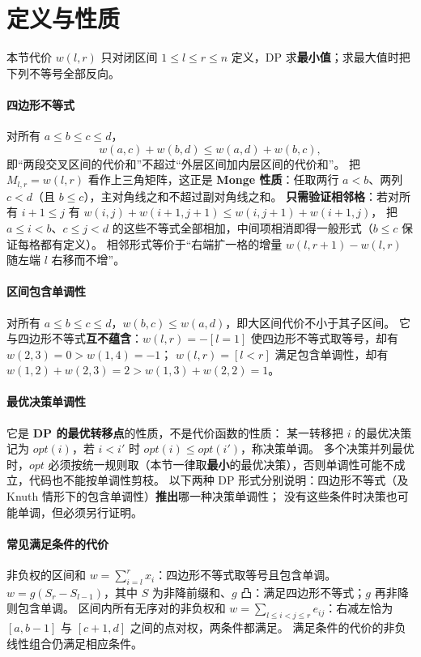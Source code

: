 \section{定义与性质}\label{knowledge-quadrangle-definitions}
本节代价 $w(l,r)$ 只对闭区间 $1\le l\le r\le n$ 定义，DP 求\textbf{最小值}；求最大值时把下列不等号全部反向。

\paragraph{四边形不等式} 对所有 $a\le b\le c\le d$，
\[
 w(a,c)+w(b,d)\le w(a,d)+w(b,c),
\]
即“两段交叉区间的代价和”不超过“外层区间加内层区间的代价和”。
把 $M_{l,r}=w(l,r)$ 看作上三角矩阵，这正是 \textbf{Monge 性质}：任取两行 $a<b$、两列 $c<d$（且 $b\le c$），主对角线之和不超过副对角线之和。
\textbf{只需验证相邻格}：若对所有 $i+1\le j$ 有 $w(i,j)+w(i+1,j+1)\le w(i,j+1)+w(i+1,j)$，
把 $a\le i<b$、$c\le j<d$ 的这些不等式全部相加，中间项相消即得一般形式（$b\le c$ 保证每格都有定义）。
相邻形式等价于“右端扩一格的增量 $w(l,r+1)-w(l,r)$ 随左端 $l$ 右移而不增”。

\paragraph{区间包含单调性} 对所有 $a\le b\le c\le d$，$w(b,c)\le w(a,d)$，即大区间代价不小于其子区间。
它与四边形不等式\textbf{互不蕴含}：$w(l,r)=-[l=1]$ 使四边形不等式取等号，却有 $w(2,3)=0>w(1,4)=-1$；
$w(l,r)=[l<r]$ 满足包含单调性，却有 $w(1,2)+w(2,3)=2>w(1,3)+w(2,2)=1$。

\paragraph{最优决策单调性} 它是 \textbf{DP 的最优转移点}的性质，不是代价函数的性质：
某一转移把 $i$ 的最优决策记为 $opt(i)$，若 $i<i'$ 时 $opt(i)\le opt(i')$，称决策单调。
多个决策并列最优时，$opt$ 必须按统一规则取（本节一律取\textbf{最小}的最优决策），否则单调性可能不成立，代码也不能按单调性剪枝。
以下两种 DP 形式分别说明：四边形不等式（及 Knuth 情形下的包含单调性）\textbf{推出}哪一种决策单调性；
没有这些条件时决策也可能单调，但必须另行证明。

\paragraph{常见满足条件的代价} 非负权的区间和 $w=\sum_{i=l}^r x_i$：四边形不等式取等号且包含单调。
$w=g(S_r-S_{l-1})$，其中 $S$ 为非降前缀和、$g$ 凸：满足四边形不等式；$g$ 再非降则包含单调。
区间内所有无序对的非负权和 $w=\sum_{l\le i<j\le r}e_{ij}$：右减左恰为 $[a,b-1]$ 与 $[c+1,d]$ 之间的点对权，两条件都满足。
满足条件的代价的非负线性组合仍满足相应条件。

